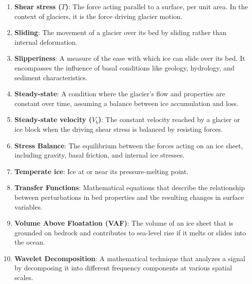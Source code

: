 \begin{enumerate}
\item \textbf{Shear stress ($T$)}: The force acting parallel to a surface, per unit area. In the context of glaciers, it is the force driving glacier motion.
\item \textbf{Sliding}: The movement of a glacier over its bed by sliding rather than internal deformation.
\item \textbf{Slipperiness}: A measure of the ease with which ice can slide over its bed. It encompasses the influence of basal conditions like geology, hydrology, and sediment characteristics.
\item \textbf{Steady-state}: A condition where the glacier's flow and properties are constant over time, assuming a balance between ice accumulation and loss.
\item \textbf{Steady-state velocity ($V_b$)}: The constant velocity reached by a glacier or ice block when the driving shear stress is balanced by resisting forces.
\item \textbf{Stress Balance}: The equilibrium between the forces acting on an ice sheet, including gravity, basal friction, and internal ice stresses.
\item \textbf{Temperate ice}: Ice at or near its pressure-melting point.
\item \textbf{Transfer Functions}: Mathematical equations that describe the relationship between perturbations in bed properties and the resulting changes in surface variables.
\item \textbf{Volume Above Floatation (VAF)}: The volume of an ice sheet that is grounded on bedrock and contributes to sea-level rise if it melts or slides into the ocean.
\item \textbf{Wavelet Decomposition}: A mathematical technique that analyzes a signal by decomposing it into different frequency components at various spatial scales.
\end{enumerate}